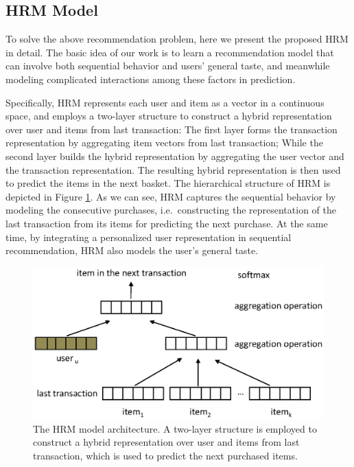\documentclass[10pt,journal,compsoc]{IEEEtran}
\begin{document}
\subsection{HRM Model}
To solve the above recommendation problem, here we present the proposed HRM in detail. The basic idea of our work is to learn a recommendation model that can involve both sequential behavior and users' general taste, and meanwhile modeling complicated interactions among these factors in prediction.

Specifically, HRM represents each user and item as a vector in a continuous space, and employs a two-layer structure to construct a hybrid representation over user and items from last transaction: The first layer forms the transaction representation by aggregating item vectors from last transaction; While the second layer builds the hybrid representation by aggregating the user vector and the transaction representation. The resulting hybrid representation is then used to predict the items in the next basket. The hierarchical structure of HRM is depicted in Figure \ref{fig:hrm}. As we can see, HRM captures the sequential behavior by modeling the consecutive purchases, i.e.~constructing the representation of the last transaction from its items for predicting the next purchase. At the same time, by integrating a personalized user representation in sequential recommendation, HRM also models the user's general taste.

\begin{figure}[t]
\centering
\includegraphics[scale=0.5,viewport=100 180 550 450,clip=true]{model.eps}
\caption{\label{fig:hrm}The HRM model architecture. A two-layer structure is employed to construct a hybrid representation over user and items from last transaction, which is used to predict the next purchased items.}
\end{figure}
\end{document}
